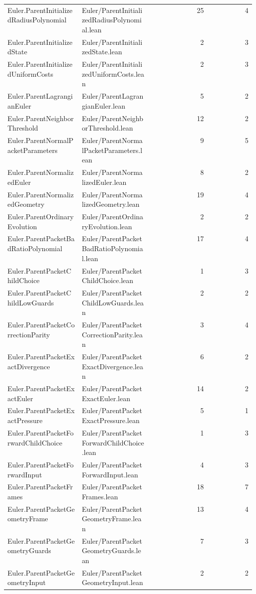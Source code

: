 \begin{longtable}{p{0.30\linewidth}p{0.28\linewidth}rr}
Euler.ParentInitializedRadiusPolynomial & Euler/ParentInitializedRadiusPolynomial.lean & 25 & 4\\
Euler.ParentInitializedState & Euler/ParentInitializedState.lean & 2 & 3\\
Euler.ParentInitializedUniformCosts & Euler/ParentInitializedUniformCosts.lean & 2 & 3\\
Euler.ParentLagrangianEuler & Euler/ParentLagrangianEuler.lean & 5 & 2\\
Euler.ParentNeighborThreshold & Euler/ParentNeighborThreshold.lean & 12 & 2\\
Euler.ParentNormalPacketParameters & Euler/ParentNormalPacketParameters.lean & 9 & 5\\
Euler.ParentNormalizedEuler & Euler/ParentNormalizedEuler.lean & 8 & 2\\
Euler.ParentNormalizedGeometry & Euler/ParentNormalizedGeometry.lean & 19 & 4\\
Euler.ParentOrdinaryEvolution & Euler/ParentOrdinaryEvolution.lean & 2 & 2\\
Euler.ParentPacketBadRatioPolynomial & Euler/ParentPacketBadRatioPolynomial.lean & 17 & 4\\
Euler.ParentPacketChildChoice & Euler/ParentPacketChildChoice.lean & 1 & 3\\
Euler.ParentPacketChildLowGuards & Euler/ParentPacketChildLowGuards.lean & 2 & 2\\
Euler.ParentPacketCorrectionParity & Euler/ParentPacketCorrectionParity.lean & 3 & 4\\
Euler.ParentPacketExactDivergence & Euler/ParentPacketExactDivergence.lean & 6 & 2\\
Euler.ParentPacketExactEuler & Euler/ParentPacketExactEuler.lean & 14 & 2\\
Euler.ParentPacketExactPressure & Euler/ParentPacketExactPressure.lean & 5 & 1\\
Euler.ParentPacketForwardChildChoice & Euler/ParentPacketForwardChildChoice.lean & 1 & 3\\
Euler.ParentPacketForwardInput & Euler/ParentPacketForwardInput.lean & 4 & 3\\
Euler.ParentPacketFrames & Euler/ParentPacketFrames.lean & 18 & 7\\
Euler.ParentPacketGeometryFrame & Euler/ParentPacketGeometryFrame.lean & 13 & 4\\
Euler.ParentPacketGeometryGuards & Euler/ParentPacketGeometryGuards.lean & 7 & 3\\
Euler.ParentPacketGeometryInput & Euler/ParentPacketGeometryInput.lean & 2 & 2\\

\end{longtable}
